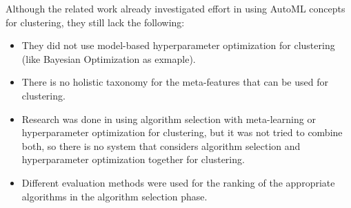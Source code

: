 Although the related work already investigated effort in using AutoML concepts for clustering, they still lack the following:

\begin{itemize}
    \item They did not use model-based hyperparameter optimization for clustering (like Bayesian Optimization as exmaple).
    \item There is no holistic taxonomy for the meta-features that can be used for clustering.
    \item Research was done in using algorithm selection with meta-learning or hyperparameter optimization for clustering, but it was not tried to combine both, so there is no system that considers algorithm selection and hyperparameter optimization together for clustering.
    \item Different evaluation methods were used for the ranking of the appropriate algorithms in the algorithm selection phase.
\end{itemize}